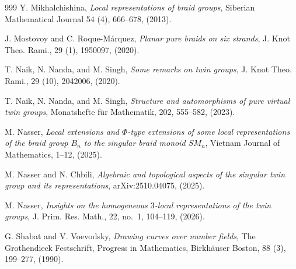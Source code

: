 \documentclass[preprint]{elsarticle}
\begin{document}
\begin{thebibliography}{999}
Y. Mikhalchishina, \textit{Local representations of braid groups}, Siberian Mathematical Journal 54 (4), 666--678, (2013).

 J. Mostovoy and C. Roque-Márquez, \emph{Planar pure braids on six strands}, {J. Knot Theo. Rami.}, 29 (1), 1950097, (2020).

T. Naik, N. Nanda, and M. Singh, \textit{Some remarks on twin groups}, {J. Knot Theo. Rami.}, 29 (10), 2042006, (2020).

T. Naik, N. Nanda, and M. Singh, \textit{Structure and automorphisms of pure virtual twin groups}, Monatshefte für Mathematik, 202, 555--582, (2023).

M. Nasser, \textit{Local extensions and $\Phi$-type extensions of some local representations of the braid group $B_n$ to the singular braid monoid $SM_n$}, Vietnam Journal of Mathematics, 1--12, (2025).

M. Nasser and N. Chbili, \textit{Algebraic and topological aspects of the singular twin group and its representations}, arXiv:2510.04075, (2025).

 M. Nasser, \emph{Insights on the homogeneous $3$-local representations of the twin groups}, {J. Prim. Res. Math.}, 22, no.~1, 104--119, (2026).

G. Shabat and V. Voevodsky, \textit{Drawing curves over number fields}, The Grothendieck Festschrift, Progress in Mathematics, Birkhäuser Boston, 88 (3), 199--277, (1990).

\end{thebibliography}
\end{document}
